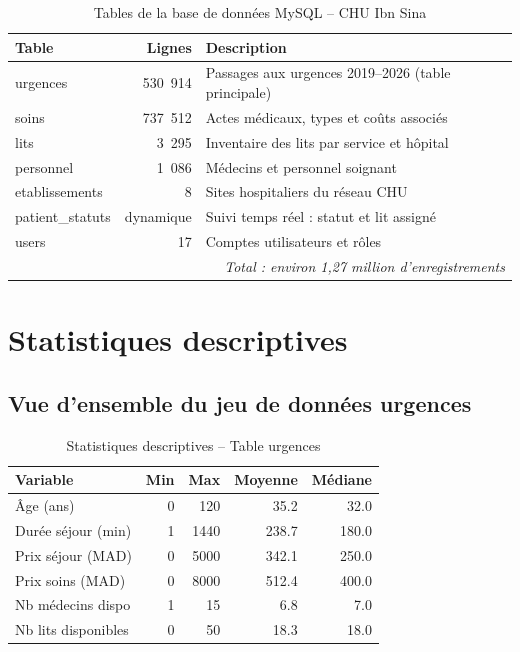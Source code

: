 \documentclass[12pt,a4paper]{report}
\begin{document}
	\begin{table}[H]
		\centering
		\caption{Tables de la base de données MySQL -- CHU Ibn Sina}
		\renewcommand{\arraystretch}{1.2}
		\begin{tabularx}{\textwidth}{lrX}
			\toprule
			\textbf{Table} & \textbf{Lignes} & \textbf{Description} \\
			\midrule
			urgences        & 530~914  & Passages aux urgences 2019--2026 (table principale) \\
			soins           & 737~512  & Actes médicaux, types et coûts associés \\
			lits            &   3~295  & Inventaire des lits par service et hôpital \\
			personnel       &   1~086  & Médecins et personnel soignant \\
			etablissements  &       8  & Sites hospitaliers du réseau CHU \\
			patient\_statuts & dynamique & Suivi temps réel : statut et lit assigné \\
			users           &      17  & Comptes utilisateurs et rôles \\
			\bottomrule
			\multicolumn{3}{r}{\small\textit{Total : environ 1,27 million d'enregistrements}} \\
		\end{tabularx}
	\end{table}
	
	\section{Statistiques descriptives}
	
	\subsection{Vue d'ensemble du jeu de données urgences}
	
	\begin{table}[H]
		\centering
		\caption{Statistiques descriptives -- Table urgences}
		\renewcommand{\arraystretch}{1.2}
		\begin{tabular}{lrrrr}
			\toprule
			\textbf{Variable} & \textbf{Min} & \textbf{Max} & \textbf{Moyenne} & \textbf{Médiane} \\
			\midrule
			Âge (ans)              & 0     & 120   & 35.2  & 32.0  \\
			Durée séjour (min)     & 1     & 1440  & 238.7 & 180.0 \\
			Prix séjour (MAD)      & 0     & 5000  & 342.1 & 250.0 \\
			Prix soins (MAD)       & 0     & 8000  & 512.4 & 400.0 \\
			Nb médecins dispo      & 1     & 15    & 6.8   & 7.0   \\
			Nb lits disponibles    & 0     & 50    & 18.3  & 18.0  \\
			\bottomrule
		\end{tabular}
	\end{table}
	
\end{document}
